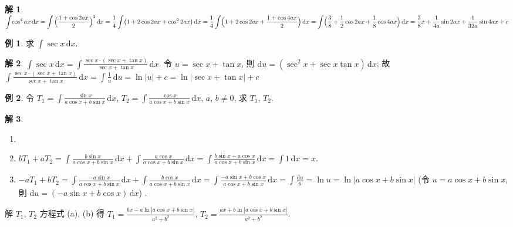 \documentclass[12pt]{extarticle}
\newcommand{\ds}{\displaystyle}
\theoremstyle{definition}
\newtheorem*{ex}{例}
\newtheorem*{sol}{解}
\begin{document}
\begin{sol}
  $\ds\int\!\cos^4 ax\,\text{d}x = \int\Big(\frac{1+\cos 2ax}{2}\Big)^2\,\text{d}x = \frac{1}{4}\int\!\big(1+2\cos 2ax+\cos^2 2ax\big)\,\text{d}x = \frac{1}{4}\int\!\Big(1+2\cos 2ax+\frac{1 + \cos 4ax}{2}\Big)\,\text{d}x \\= \int\!\Big(\frac{3}{8}+\frac{1}{2}\cos 2ax+\frac{1}{8}\cos 4ax\Big)\,\text{d}x = \frac{3}{8}x +\frac{1}{4a}\sin 2ax+\frac{1}{32a}\sin 4ax + c$
\end{sol}
 
\begin{ex}
  求 $\ds\int\!\sec x\,\text{d}x$. 
\end{ex}

\begin{sol}
  $\ds\int\!\sec x\,\text{d}x = \int\!\frac{\sec x\cdot(\sec x + \tan x)}{\sec x + \tan x}\,\text{d}x$. 令 $u = \sec x + \tan x$, 則 $\ds\text{d}u = (\sec^2 x + \sec x\tan x)\,\text{d}x$; 故 $\ds\int\!\frac{\sec x\cdot(\sec x + \tan x)}{\sec x + \tan x}\,\text{d}x = \int\!\frac{1}{u}\,\text{d}u = \ln|u| + c = \ln|\sec x + \tan x| + c$
\end{sol}

\begin{ex}
  令 $\ds T_1 = \int\!\frac{\sin x}{a\cos x + b\sin x}\,\text{d}x$, $\ds T_2 = \int\!\frac{\cos x}{a\cos x + b\sin x}\,\text{d}x$, $a$, $b\ne 0$, 求 $T_1$, $T_2$. 
\end{ex}

\begin{sol}
  \begin{enumerate}[label=(\alph*)]\setlength{\itemsep}{0pt}
    \item[]
    \item $\ds b T_1 + a T_2 = \int\!\frac{b\sin x}{a\cos x + b\sin x}\,\text{d}x + \int\!\frac{a\cos x}{a\cos x + b\sin x}\,\text{d}x = \int\!\frac{b\sin x + a\cos x}{a\cos x + b\sin x}\,\text{d}x = \int 1\,\text{d}x = x$. 
    \item $\ds -a T_1 + b T_2 = \int\!\frac{-a\sin x}{a\cos x + b\sin x}\,\text{d}x + \int\!\frac{b\cos x}{a\cos x + b\sin x}\,\text{d}x = \int\!\frac{-a\sin x + b\cos x}{a\cos x + b\sin x}\,\text{d}x = \int\!\frac{\text{d}u}{u} = \ln u = \ln|a\cos x + b\sin x|$ (令 $\ds u = a\cos x + b\sin x$, 則 $\ds\text{d}u = (-a\sin x + b\cos x)\,\text{d}x$) . 
  \end{enumerate}
  解 $T_1$, $T_2$ 方程式 (a), (b) 得 $\ds T_1 = \frac{bx - a\ln|a\cos x + b\sin x|}{a^2 + b^2}$, $\ds T_2 = \frac{ax + b\ln|a\cos x + b\sin x|}{a^2 + b^2}$. 
\end{sol}
\end{document}
